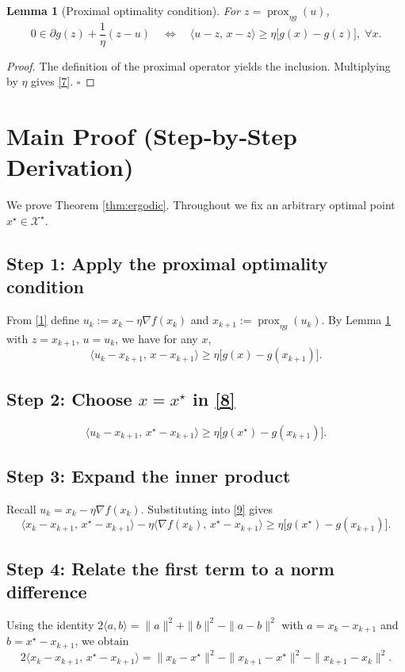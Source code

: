\documentclass{article}
\newtheorem{lemma}{Lemma}
\newcommand{\prox}{\operatorname{prox}}
\newcommand{\grad}{\nabla}
\begin{document}
\begin{lemma}[Proximal optimality condition]\label{lem:prox_opt}
For $z=\prox_{\eta g}(u)$,
\[
0\in \partial g(z)+\frac{1}{\eta}(z-u)
\quad\Longleftrightarrow\quad
\langle u-z,\,x-z\rangle\ge \eta\bigl[g(x)-g(z)\bigr],\;\forall x.
\tag{7}
\]
\end{lemma}
\begin{proof}
The definition of the proximal operator yields the inclusion. Multiplying by $\eta$ gives \eqref{7}. $\square$
\end{proof}

\section*{Main Proof (Step‑by‑Step Derivation)}
We prove Theorem \ref{thm:ergodic}.  Throughout we fix an arbitrary optimal point $x^\star\in\mathcal X^\star$.

\subsection*{Step 1: Apply the proximal optimality condition}
From \eqref{1} define $u_k:=x_k-\eta\grad f(x_k)$ and $x_{k+1}:=\prox_{\eta g}(u_k)$.  
By Lemma \ref{lem:prox_opt} with $z=x_{k+1}$, $u=u_k$, we have for any $x$,
\[
\langle u_k-x_{k+1},\,x-x_{k+1}\rangle\ge \eta\bigl[g(x)-g(x_{k+1})\bigr].
\tag{8}
\]

\subsection*{Step 2: Choose $x=x^\star$ in \eqref{8}}
\[
\langle u_k-x_{k+1},\,x^\star-x_{k+1}\rangle\ge \eta\bigl[g(x^\star)-g(x_{k+1})\bigr].
\tag{9}
\]

\subsection*{Step 3: Expand the inner product}
Recall $u_k=x_k-\eta\grad f(x_k)$.  Substituting into \eqref{9} gives
\[
\langle x_k-x_{k+1},\,x^\star-x_{k+1}\rangle
-\eta\langle\grad f(x_k),\,x^\star-x_{k+1}\rangle
\ge \eta\bigl[g(x^\star)-g(x_{k+1})\bigr].
\tag{10}
\]

\subsection*{Step 4: Relate the first term to a norm difference}
Using the identity $2\langle a,b\rangle = \|a\|^{2}+\|b\|^{2}-\|a-b\|^{2}$ with
$a=x_k-x_{k+1}$ and $b=x^\star-x_{k+1}$, we obtain
\[
2\langle x_k-x_{k+1},\,x^\star-x_{k+1}\rangle
= \|x_k-x^\star\|^{2}-\|x_{k+1}-x^\star\|^{2}-\|x_{k+1}-x_k\|^{2}.
\tag{11}
\]
\end{document}
